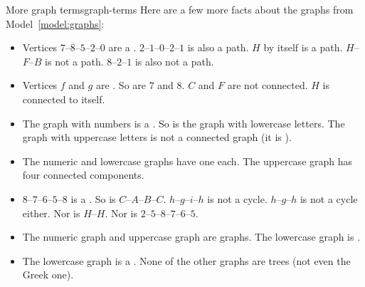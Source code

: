 \documentclass{tufte-handout}
\begin{document}
\newpage
\begin{model*}{More graph terms}{graph-terms}
Here are a few more facts about the graphs from
Model~\ref{model:graphs}:

\begin{itemize}
\item Vertices $7$--$8$--$5$--$2$--$0$ are a .
  $2$--$1$--$0$--$2$--$1$ is also a path.  $H$ by itself is a
  path. $H$--$F$--$B$ is not a path.  $8$--$2$--$1$ is also not a path.
\item Vertices $f$ and $g$ are .  So are $7$ and $8$.
  $C$ and $F$ are not connected.  $H$ is connected to itself.
\item The graph with numbers is a .  So is the
  graph with lowercase letters.  The graph with uppercase letters is
  not a connected graph (it is ).
\item The numeric and lowercase graphs have one  each.  The uppercase graph has four connected
  components.
\item $8$--$7$--$6$--$5$--$8$ is a .  So is $C$--$A$--$B$--$C$.
  $h$--$g$--$i$--$h$ is not a cycle.  $h$--$g$--$h$ is not a cycle
  either.  Nor is $H$--$H$.  Nor is $2$--$5$--$8$--$7$--$6$--$5$.
\item The numeric graph and uppercase graph are  graphs.
  The lowercase graph is .
\item The lowercase graph is a .  None of the other graphs
  are trees (not even the Greek one).
\end{itemize}
\end{model*}
\end{document}
